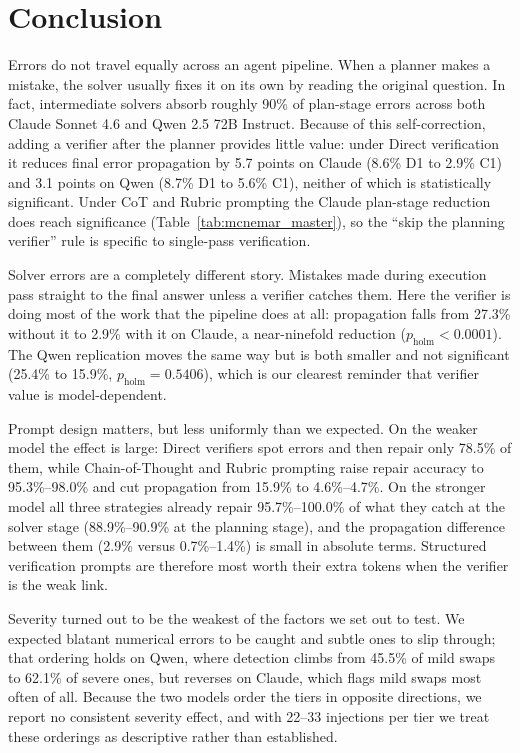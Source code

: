 \documentclass[11pt]{article}
\begin{document}
\section{Conclusion}
Errors do not travel equally across an agent pipeline. When a planner makes a mistake, the solver usually fixes it on its own by reading the original question. In fact, intermediate solvers absorb roughly 90\% of plan-stage errors across both Claude Sonnet 4.6 and Qwen 2.5 72B Instruct. Because of this self-correction, adding a verifier after the planner provides little value: under Direct verification it reduces final error propagation by 5.7 points on Claude (8.6\% D1 to 2.9\% C1) and 3.1 points on Qwen (8.7\% D1 to 5.6\% C1), neither of which is statistically significant. Under CoT and Rubric prompting the Claude plan-stage reduction does reach significance (Table~\ref{tab:mcnemar_master}), so the ``skip the planning verifier'' rule is specific to single-pass verification.

Solver errors are a completely different story. Mistakes made during execution pass straight to the final answer unless a verifier catches them. Here the verifier is doing most of the work that the pipeline does at all: propagation falls from 27.3\% without it to 2.9\% with it on Claude, a near-ninefold reduction ($p_{\mathrm{holm}} < 0.0001$). The Qwen replication moves the same way but is both smaller and not significant (25.4\% to 15.9\%, $p_{\mathrm{holm}} = 0.5406$), which is our clearest reminder that verifier value is model-dependent.

Prompt design matters, but less uniformly than we expected. On the weaker model the effect is large: Direct verifiers spot errors and then repair only 78.5\% of them, while Chain-of-Thought and Rubric prompting raise repair accuracy to 95.3\%--98.0\% and cut propagation from 15.9\% to 4.6\%--4.7\%. On the stronger model all three strategies already repair 95.7\%--100.0\% of what they catch at the solver stage (88.9\%--90.9\% at the planning stage), and the propagation difference between them (2.9\% versus 0.7\%--1.4\%) is small in absolute terms. Structured verification prompts are therefore most worth their extra tokens when the verifier is the weak link.

Severity turned out to be the weakest of the factors we set out to test. We expected blatant numerical errors to be caught and subtle ones to slip through; that ordering holds on Qwen, where detection climbs from 45.5\% of mild swaps to 62.1\% of severe ones, but reverses on Claude, which flags mild swaps most often of all. Because the two models order the tiers in opposite directions, we report no consistent severity effect, and with 22--33 injections per tier we treat these orderings as descriptive rather than established.
\end{document}
